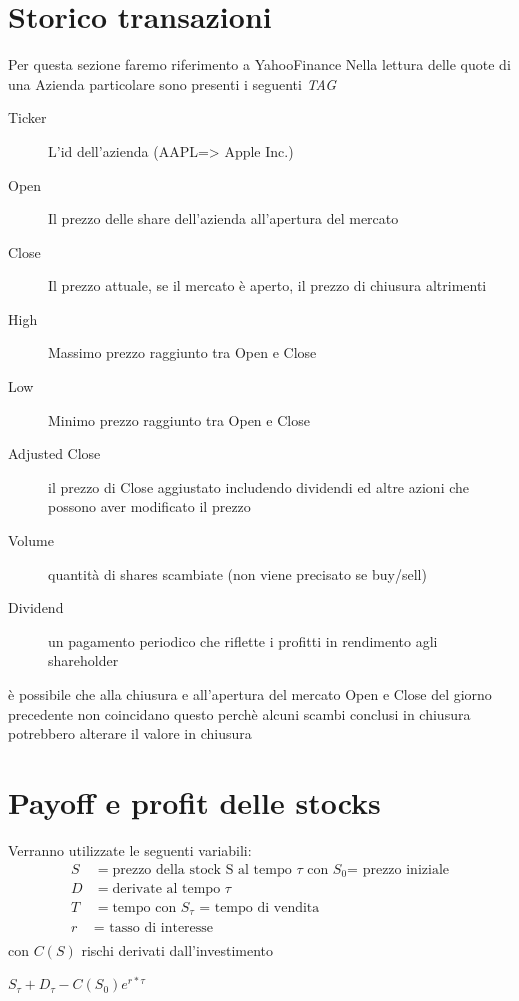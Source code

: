 \documentclass[a4paper,11pt]{report}
\begin{document}
{%

\section{Storico transazioni}
	{\tiny{Per questa sezione faremo riferimento a YahooFinance}} \newline
	Nella lettura delle quote di una Azienda particolare sono presenti i seguenti \emph{TAG} \newline
\begin{description}
	\item[Ticker] L'id dell'azienda (AAPL=> Apple Inc.)
	\item[Open] Il prezzo delle share dell'azienda all'apertura del mercato
	\item[Close] Il prezzo attuale, se il mercato è aperto, il prezzo di chiusura altrimenti
	\item[High] Massimo prezzo raggiunto tra Open e Close
	\item[Low] Minimo prezzo raggiunto tra Open e Close
	\item[Adjusted Close] il prezzo di Close aggiustato includendo dividendi ed altre azioni che possono aver modificato il prezzo
	\item[Volume] quantità di shares scambiate (non viene precisato se buy/sell)
	\item[Dividend] un pagamento periodico che riflette i profitti in rendimento agli shareholder
\end{description}
	è possibile che alla chiusura e all'apertura del mercato Open e Close del giorno precedente non coincidano \newline
	questo perchè alcuni scambi conclusi in chiusura potrebbero alterare il valore in chiusura %
\newpage


\section{Payoff e profit delle stocks}
	Verranno utilizzate le seguenti variabili:
\begin{align*} %
	S &= {\text {prezzo della stock S al tempo $\tau$ con $S_0$= prezzo iniziale}}\\
	D&= {\text {derivate al tempo $\tau$ }}\\
	T &= {\text {tempo con $S_\tau$ = tempo di vendita}}\\
	r &= {\text { tasso di interesse}}\\
\end{align*}
	con $C(S)$ rischi derivati dall'investimento
\begin{center}
	$S_\tau + D_\tau - C(S_0)e^{r*\tau}$
\end{center}
}
\end{document}
